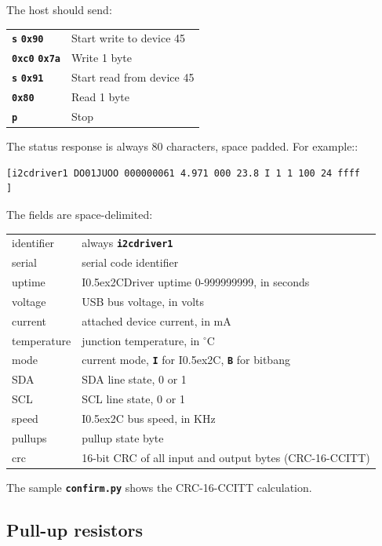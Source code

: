 \documentclass{article}
\newcommand{\two}{\raise0.5ex\hbox{\footnotesize{2}}}
\newcommand{\iic}{I\two{}C}
\newcommand{\iicdriver}{I\two{}CDriver}
\newcommand{\degc}{$^{\circ}$C}
\newcommand{\mach}[1]{\texttt{\textbf{#1}}}
\newcommand{\gap}{\vspace{10pt}}
\begin{document}
The host should send:

\gap\begin{tabular}{ll}
\mach{s} \mach{0x90}    & Start write to device 45 \\
\mach{0xc0} \mach{0x7a} & Write 1 byte \\
\mach{s} \mach{0x91}    & Start read from device 45 \\
\mach{0x80}          & Read 1 byte \\
\mach{p}             & Stop \\
\end{tabular}\gap

The status response is always 80 characters, space padded. For example::

\begin{lstlisting}
[i2cdriver1 DO01JUOO 000000061 4.971 000 23.8 I 1 1 100 24 ffff                ]
\end{lstlisting}

The fields are space-delimited:

\gap\begin{tabular}{ll}
\hline
identifier     & always \mach{i2cdriver1} \\
serial         & serial code identifier \\
uptime         & \iicdriver{} uptime 0-999999999, in seconds \\
voltage        & USB bus voltage, in volts \\
current        & attached device current, in mA \\
temperature    & junction temperature, in \degc \\
mode           & current mode, \mach{I} for \iic{}, \mach{B} for bitbang \\
SDA            & SDA line state, 0 or 1 \\
SCL            & SCL line state, 0 or 1 \\
speed          & \iic{} bus speed, in KHz \\
pullups        & pullup state byte \\
crc            & 16-bit CRC of all input and output bytes (CRC-16-CCITT) \\
\hline\end{tabular}\gap

The sample \mach{confirm.py} shows the CRC-16-CCITT calculation.

\subsection{Pull-up resistors}
\end{document}

